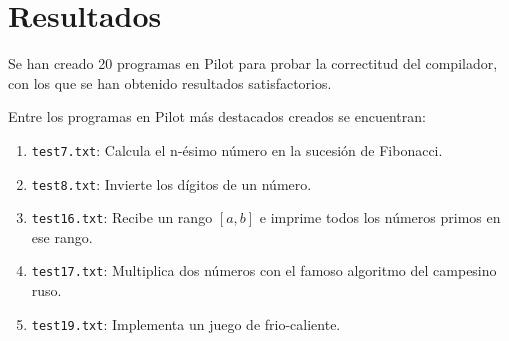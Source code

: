 \documentclass[12pt,spanish]{article}
\begin{document}
\section{Resultados}
Se han creado 20 programas en Pilot para probar la correctitud del compilador, con los que se han obtenido resultados satisfactorios.

\noindent
Entre los programas en Pilot más destacados creados se encuentran:
\begin{enumerate}
\item{\texttt{test7.txt}: Calcula el n-ésimo número en la sucesión de Fibonacci.}
\item{\texttt{test8.txt}: Invierte los dígitos de un número.}
\item{\texttt{test16.txt}: Recibe un rango $[a, b]$ e imprime todos los números primos en ese rango.}
\item{\texttt{test17.txt}: Multiplica dos números con el famoso algoritmo del campesino ruso.}
\item{\texttt{test19.txt}: Implementa un juego de frio-caliente.}
\end{enumerate}
 
\end{document}
